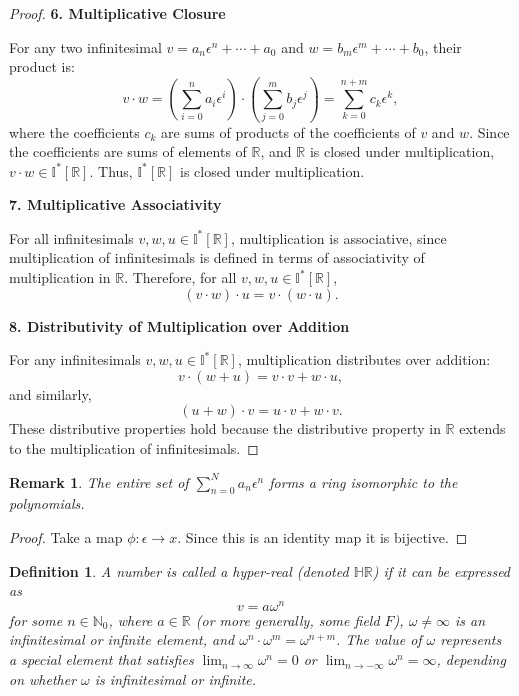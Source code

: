 \documentclass[10pt, oneside]{article}
\newcommand{\R}{\mathbb{R}}
\newcommand{\I}{\mathbb{I}}
\newcommand{\HR}{\mathbb{HR}}
\newtheorem{defn}{Definition}
\newtheorem{rem}{Remark}
\begin{document}
\begin{proof}
\textbf{6. Multiplicative Closure}

For any two infinitesimal \( v = a_n \epsilon^n + \cdots + a_0 \) and \( w = b_m \epsilon^m + \cdots + b_0 \), their product is:
\[
v \cdot w = \left( \sum_{i=0}^n a_i \epsilon^i \right) \cdot \left( \sum_{j=0}^m b_j \epsilon^j \right) = \sum_{k=0}^{n+m} c_k \epsilon^k,
\]
where the coefficients \( c_k \) are sums of products of the coefficients of \( v \) and \( w \). Since the coefficients are sums of elements of \( \R \), and \( \R \) is closed under multiplication, \( v \cdot w \in \I^{*}[\R] \). Thus, \( \I^{*}[\R] \) is closed under multiplication.

\textbf{7. Multiplicative Associativity}

For all infinitesimals \( v, w, u \in \I^{*}[\R] \), multiplication is associative, since multiplication of infinitesimals is defined in terms of associativity of multiplication in \(\R \). Therefore, for all \( v, w, u \in \I^{*}[\R] \),
\[
(v \cdot w) \cdot u = v \cdot (w \cdot u).
\]

\textbf{8. Distributivity of Multiplication over Addition}

For any infinitesimals \( v, w, u \in \I^{*}[\R] \), multiplication distributes over addition:
\[
v \cdot (w + u) = v \cdot v + w \cdot u,
\]
and similarly,
\[
(u + w) \cdot v = u \cdot v + w \cdot v.
\]
These distributive properties hold because the distributive property in \( \R\) extends to the multiplication of infinitesimals.
\end{proof}
\begin{rem}
    The entire set of $\sum_{n=0}^N a_n \epsilon^{n}$ forms a ring isomorphic to the polynomials. 
\end{rem}
\begin{proof}
    Take a map $\phi: \epsilon \to x$. Since this is an identity map it is bijective. 
\end{proof}
\begin{defn}
    A number is called a hyper-real (denoted \( \HR \)) if it can be expressed as
    \[
    v = a \omega^n
    \]
    for some \( n \in \mathbb{N}_0 \), where \( a \in \mathbb{R} \) (or more generally, some field \( F \)), \( \omega \neq \infty \) is an infinitesimal or infinite element, and \( \omega^n \cdot \omega^m = \omega^{n+m} \). The value of \( \omega \) represents a special element that satisfies \( \lim_{n \to \infty} \omega^n = 0 \) or \( \lim_{n \to -\infty} \omega^n = \infty \), depending on whether \( \omega \) is infinitesimal or infinite.
\end{defn}
\end{document}

